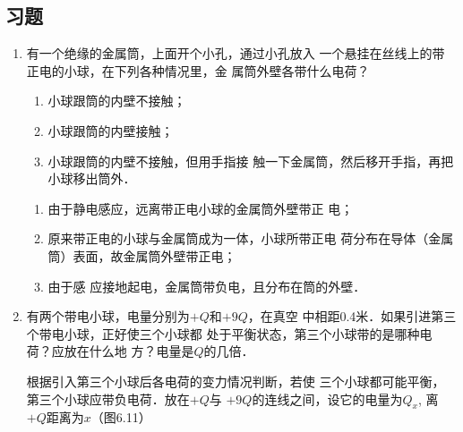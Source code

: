 \subsection{习题}
\begin{enumerate}
\item 有一个绝缘的金属筒，上面开个小孔，通过小孔放入
一个悬挂在丝线上的带正电的小球，在下列各种情况里，金
属筒外壁各带什么电荷？
\begin{enumerate}
\item 小球跟筒的内壁不接触；
\item 小球跟筒的内壁接触；
\item 小球跟筒的内壁不接触，但用手指接
触一下金属筒，然后移开手指，再把小球移出筒外．
\end{enumerate}


\begin{solution}
\begin{enumerate}
    \item 由于静电感应，远离带正电小球的金属筒外壁带正
    电；
    \item 原来带正电的小球与金属筒成为一体，小球所带正电
    荷分布在导体（金属筒）表面，故金属筒外壁带正电；
    \item 由于感
    应接地起电，金属筒带负电，且分布在筒的外壁．
\end{enumerate}
\end{solution}

\item 有两个带电小球，电量分别为$+Q$和$+9Q$，在真空
中相距0.4米．如果引进第三个带电小球，正好使三个小球都
处于平衡状态，第三个小球带的是哪种电荷？应放在什么地
方？电量是$Q$的几倍．

\begin{solution}
根据引入第三个小球后各电荷的变力情况判断，若使
三个小球都可能平衡，第三个小球应带负电荷．放在$+Q$与
$+9Q$的连线之间，设它的电量为$Q_x$, 离$+Q$距离为$x$（图6.11）
\begin{figure}[htp]
    \centering
{}
    \caption{}
\end{figure}


\end{solution}
\end{enumerate}
